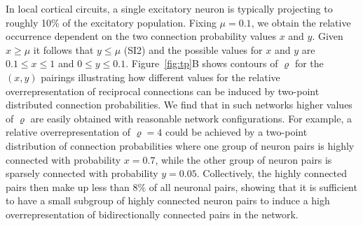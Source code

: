 In local cortical circuits, a single excitatory neuron is typically
projecting to roughly 10\% of the excitatory population.
%
Fixing $\mu = 0.1$, we obtain the relative occurrence dependent on the
two connection probability values $x$ and $y$.
%
Given $x \geq \mu$ it follows that $y \leq \mu$ (SI2) and
the possible values for $x$ and $y$ are $0.1 \leq x \leq 1$ and $0
\leq y \leq 0.1$.
%
Figure~\ref{fig:tp}B shows contours of $\varrho$ for the $(x,y)$
pairings illustrating how different values for the relative
overrepresentation of reciprocal connections can be induced by
two-point distributed connection probabilities.
%
We find that in such networks higher values of $\varrho$ are easily
obtained with reasonable network configurations. %
%
For example, a relative overrepresentation of $\varrho=4$ could be
achieved by a two-point distribution of connection probabilities where
one group of neuron pairs is highly connected with probability
$x=0.7$, while the other group of neuron pairs is sparsely connected
with probability $y=0.05$.
%
Collectively, the highly connected pairs then make up less than $8\%$
of all neuronal pairs, showing that it is sufficient to have a small
subgroup of highly connected neuron pairs to induce a high
overrepresentation of bidirectionally connected pairs in the network.





